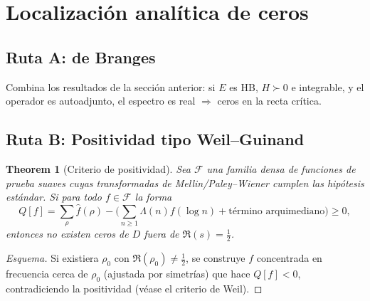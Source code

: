 \section{Localización analítica de ceros}

\newtheorem{theoremD}{Theorem}[section]
\newtheorem{lemmaD}[theoremD]{Lemma}

\subsection*{Ruta A: de Branges}
Combina los resultados de la sección anterior: si $E$ es HB, $H\succ 0$ e integrable,
y el operador es autoadjunto, el espectro es real $\Rightarrow$ ceros en la recta crítica.

\subsection*{Ruta B: Positividad tipo Weil--Guinand}

\begin{theoremD}[Criterio de positividad]
Sea $\mathcal F$ una familia densa de funciones de prueba suaves
cuyas transformadas de Mellin/Paley--Wiener cumplen las hipótesis estándar.
Si para todo $f\in\mathcal F$ la forma
\[
Q[f]=\sum_{\rho}\widehat f(\rho)-\Big(\sum_{n\ge1}\Lambda(n)f(\log n)+\text{término arquimediano}\Big)\ge 0,
\]
entonces no existen ceros de $D$ fuera de $\Re(s)=\tfrac{1}{2}$.
\end{theoremD}

\begin{proof}[Esquema]
Si existiera $\rho_0$ con $\Re(\rho_0)\neq \tfrac{1}{2}$, se construye $f$
concentrada en frecuencia cerca de $\rho_0$ (ajustada por simetrías) que hace
$Q[f]<0$, contradiciendo la positividad (véase el criterio de Weil).
\end{proof}
